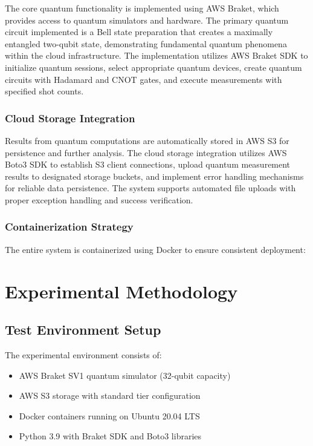 \documentclass[onecolumn]{IEEEtran}
\begin{document}
The core quantum functionality is implemented using AWS Braket, which provides access to quantum simulators and hardware. The primary quantum circuit implemented is a Bell state preparation that creates a maximally entangled two-qubit state, demonstrating fundamental quantum phenomena within the cloud infrastructure. The implementation utilizes AWS Braket SDK to initialize quantum sessions, select appropriate quantum devices, create quantum circuits with Hadamard and CNOT gates, and execute measurements with specified shot counts.

\subsubsection{Cloud Storage Integration}

Results from quantum computations are automatically stored in AWS S3 for persistence and further analysis. The cloud storage integration utilizes AWS Boto3 SDK to establish S3 client connections, upload quantum measurement results to designated storage buckets, and implement error handling mechanisms for reliable data persistence. The system supports automated file uploads with proper exception handling and success verification.

\subsubsection{Containerization Strategy}

The entire system is containerized using Docker to ensure consistent deployment:



\section{Experimental Methodology}

\subsection{Test Environment Setup}

The experimental environment consists of:
\begin{itemize}
    \item AWS Braket SV1 quantum simulator (32-qubit capacity)
    \item AWS S3 storage with standard tier configuration
    \item Docker containers running on Ubuntu 20.04 LTS
    \item Python 3.9 with Braket SDK and Boto3 libraries
\end{itemize}
\end{document}
